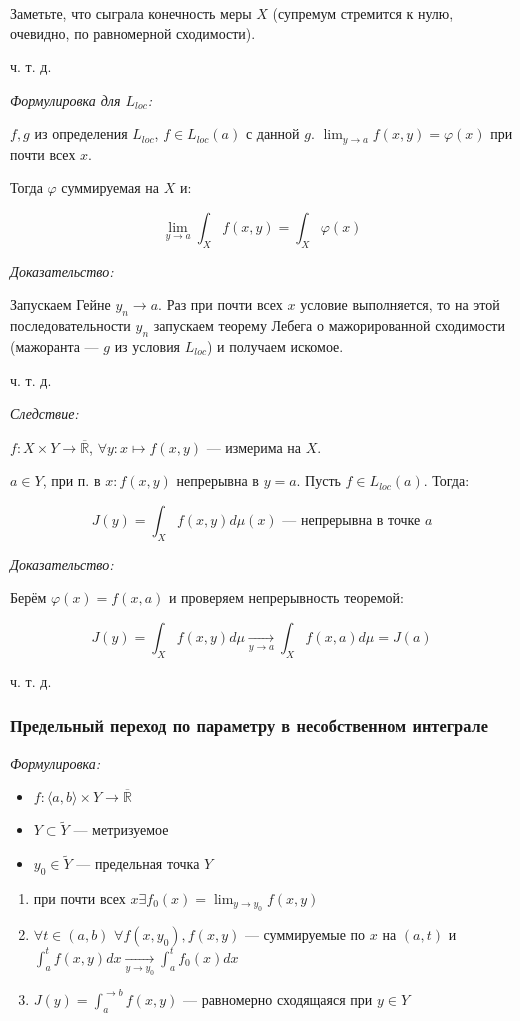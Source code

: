\documentclass{article}
\def\dbl{\,\,}
\def\rinf{\overline{\mathbb{R}}}
\def\goesto#1{\underset{#1}{\longrightarrow}}
\begin{document}
Заметьте, что сыграла конечность меры $X$ (супремум стремится к нулю, очевидно, по равномерной сходимости).

ч. т. д. 

\textit{Формулировка для $L_{loc}$:}

$f, g$ из определения $L_{loc}$, $f \in L_{loc}(a)$ с данной $g$. $\lim_{y \rightarrow a} f(x, y) = \varphi(x)$ при почти всех $x$.

Тогда $\varphi$ суммируемая на $X$ и:

\[\lim_{y \rightarrow a} \int_{X} f(x, y) = \int_{X} \varphi(x)\]

\textit{Доказательство:}

Запускаем Гейне $y_n \rightarrow a$. Раз при почти всех $x$ условие выполняется, то на этой последовательности $y_n$ запускаем теорему Лебега о мажорированной сходимости (мажоранта --- $g$ из условия $L_{loc}$) и получаем искомое.

ч. т. д.

\textit{Следствие:}

$f: X \times Y \rightarrow \rinf$, $\forall y: x \mapsto f(x, y)$ --- измерима на $X$.

$a \in Y$, при п. в $x: f(x, y)$ непрерывна в $y = a$. Пусть $f \in L_{loc}(a)$. Тогда:


\[J(y) = \int_{X} f(x, y) d\mu(x) \text{ --- непрерывна в точке } a\]

\textit{Доказательство: }

Берём $\varphi(x) = f(x, a)$ и проверяем непрерывность теоремой:

\[J(y) = \int_{X} f(x, y) d\mu \goesto{y \rightarrow a} \int_{X} f(x, a) d\mu = J(a)\]

ч. т. д. 

\subsubsection{Предельный переход по параметру в несобственном интеграле}
\textit{Формулировка:}

\begin{itemize}
    \item $f: \langle a, b \rangle \times Y \rightarrow \rinf$
    \item $Y \subset \tilde{Y}$ --- метризуемое
    \item $y_0 \in \tilde{Y}$ --- предельная точка $Y$
\end{itemize}

\begin{enumerate}
    \item при почти всех $x \exists f_0(x) = \lim_{y \rightarrow y_0} f(x, y)$
    \item $\forall t \in (a, b) \dbl \forall f(x, y_0), f(x, y)$ --- суммируемые по $x$ на $(a, t)$ и $\int_a^{t} f(x, y) dx \goesto{y \rightarrow y_0} \int_a^{t} f_0(x) dx$
    \item $J(y) = \int_a^{\rightarrow b} f(x, y)$ --- равномерно сходящаяся при $y \in Y$
\end{enumerate}
\end{document}
